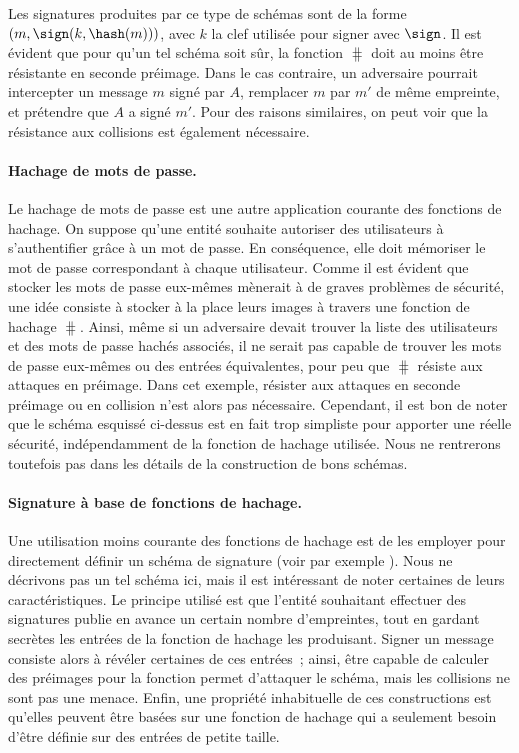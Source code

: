 Les signatures produites par ce type de schémas sont de la forme 
$(m, \sign(k,\hash(m)))$, avec $k$ la clef utilisée pour signer avec $\sign$.
Il est évident que pour qu'un tel schéma soit sûr, la fonction $\hash$ doit au moins être résistante en seconde préimage. Dans le cas contraire, un adversaire
pourrait intercepter un message $m$ signé par $A$, remplacer $m$ par $m'$ de même empreinte, et prétendre que $A$ a signé $m'$.
Pour des raisons similaires, on peut voir que la résistance aux collisions est également nécessaire.

\paragraph{Hachage de mots de passe.} Le hachage de mots de passe est une autre application courante des fonctions de hachage.
On suppose qu'une entité souhaite autoriser des utilisateurs à s'authentifier grâce à un mot de passe.
En conséquence, elle doit mémoriser le mot de passe correspondant à chaque utilisateur. Comme il est évident que stocker les mots
de passe eux-mêmes mènerait à de graves problèmes de sécurité, une idée consiste à stocker à la place leurs images à travers une fonction
de hachage $\hash$. Ainsi, même si un adversaire devait trouver la liste des utilisateurs et des mots de passe hachés associés, il ne serait
pas capable de trouver les mots de passe eux-mêmes ou des entrées équivalentes, pour peu que $\hash$ résiste aux attaques en préimage.
Dans cet exemple, résister aux attaques en seconde préimage ou en collision n'est alors pas nécessaire. Cependant, il est bon de noter
que le schéma esquissé ci-dessus est en fait trop simpliste pour apporter une réelle sécurité, indépendamment de la fonction de hachage
utilisée. Nous ne rentrerons toutefois pas dans les détails de la construction de bons schémas.

\paragraph{Signature à base de fonctions de hachage.}
Une utilisation moins courante des fonctions de hachage est de les employer pour directement définir un schéma de signature
(voir par exemple \cite{DBLP:conf/crypto/Merkle87}). Nous ne décrivons pas un tel schéma ici, mais il est intéressant de noter certaines
de leurs caractéristiques.
Le principe utilisé est que l'entité souhaitant effectuer des signatures publie en avance un certain nombre d'empreintes, tout en gardant
secrètes les entrées de la fonction de hachage les produisant. Signer un message consiste alors à révéler certaines de ces entrées~; ainsi, être capable
de calculer des préimages pour la fonction permet d'attaquer le schéma, mais les collisions ne sont pas une menace.
Enfin, une propriété inhabituelle de ces constructions est qu'elles peuvent être basées sur une fonction de hachage qui a seulement besoin
d'être définie sur des entrées de petite taille.

